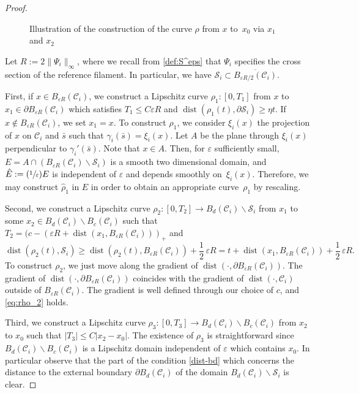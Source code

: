\documentclass[11pt]{article}
\newcommand{\Psfrac}[2]{(\sfrac{#1}{#2})}
\let\eps\varepsilon
\DeclareMathOperator{\dist}{dist}
\theoremstyle{definition}
\theoremstyle{remark}
\begin{document}
\begin{proof}
\begin{figure}
\begin{tikzpicture}[scale=.9]
\end{tikzpicture}

\caption{\label{fig:John}Illustration of the construction of the curve $\rho$ from $x$ to~$x_0$ via $x_1$ and $x_2$}
\end{figure}

Let $R := 2 \|\Psi_i\|_\infty$, where we recall from \eqref{def:S^eps} that $\Psi_i$ specifies the cross section of the reference filament. In particular, we have $\mathcal S_i \subset \overline{B_{\eps R/2}(\mathcal C_i)}$.

First, if $x \in B_{\eps R}(\mathcal C_i)$, we construct a Lipschitz curve $\rho_1 \colon [0, T_1]$ from $x$ to $x_1 \in \partial B_{\eps R}(\mathcal C_i)$ which satisfies $T_1 \leq C \eps R$ and $\dist(\rho_1(t),\partial \mathcal S_i) \geq \eta t$.
If $x \not \in B_{\eps R}(\mathcal C_i)$, we set $x_1 = x$. To construct $\rho_1$, we consider $\xi_i(x)$ the projection of $x$ on $\mathcal C_i$ and $\bar s$ such that $\gamma_i (\bar s) = \xi_i (x)$. Let $A$ be the plane through $\xi_i(x)$ perpendicular to $\gamma_i'(\bar s)$. Note that $x \in A$.
Then, for $\eps$ sufficiently small, $E = A \cap (B_{\eps R}(\mathcal C_i) \smallsetminus \mathcal S_i)$ is a smooth two dimensional domain, and $\hat E := \Psfrac 1 \eps E$ is independent of $\eps$ and depends smoothly on~$\xi_i(x)$. Therefore, we may construct $\hat \rho_1$ in $\hat E$ in order to obtain an appropriate curve~$\rho_1$ by rescaling.

Second, we construct a Lipschitz curve $\rho_2 \colon [0,T_2] \to B_d(\mathcal
C_i) \smallsetminus \mathcal S_i$ from $x_1$ to some $x_2 \in B_d(\mathcal C_i) \smallsetminus B_c(\mathcal C_i)$
such that $T_2 = (c - (\eps R + \dist(x_1, B_{\eps R}(\mathcal C_i)))_+$ and
\begin{equation} \label{eq:rho_2}
\dist(\rho_2(t), \mathcal S_i) \geq \dist(\rho_2(t), B_{\eps R}(\mathcal C_i)) + \frac 1 2\, \eps R = t + \dist(x_1, B_{\eps R}(\mathcal C_i)) + \frac 1 2\, \eps R.
\end{equation}
To construct $\rho_2$, we just move along the gradient of $\dist(\cdot,\partial B_{\eps R}(\mathcal C_i))$. The gradient
of $\dist(\cdot,\partial B_{\eps R}(\mathcal C_i))$ coincides with the gradient of $\dist(\cdot,\mathcal C_i)$ outside of $B_{\eps R}(\mathcal C_i)$. The gradient is well defined through our choice of $c$, and \eqref{eq:rho_2} holds.

Third, we construct a Lipschitz curve $\rho_3 \colon [0,T_3] \to B_d(\mathcal C_i) \smallsetminus B_c(\mathcal C_i)$ from $x_2$ to $x_0$
such that $|T_3|\leq C|x_2 - x_0|$.
The existence of $\rho_3$ is straightforward since $B_d(\mathcal C_i) \smallsetminus B_c(\mathcal C_i)$ is a Lipschitz domain independent of $\eps$ which contains $x_0$.
In particular observe that the part of the condition \eqref{dist-bd} which concerns the distance to the external boundary $\partial B_d(\mathcal C_i) $ of the domain
$B_d(\mathcal C_i) \smallsetminus \mathcal S_i$ is clear.


\end{proof}
\end{document}
